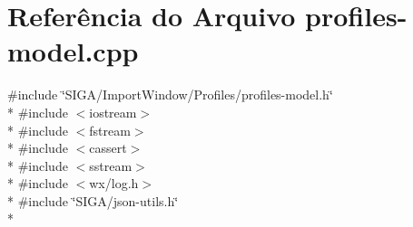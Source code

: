 \section{Referência do Arquivo profiles-\/model.cpp}
\label{profiles-model_8cpp}
{\ttfamily \#include \char`\"{}S\+I\+G\+A/\+Import\+Window/\+Profiles/profiles-\/model.\+h\char`\"{}}\\*
{\ttfamily \#include $<$iostream$>$}\\*
{\ttfamily \#include $<$fstream$>$}\\*
{\ttfamily \#include $<$cassert$>$}\\*
{\ttfamily \#include $<$sstream$>$}\\*
{\ttfamily \#include $<$wx/log.\+h$>$}\\*
{\ttfamily \#include \char`\"{}S\+I\+G\+A/json-\/utils.\+h\char`\"{}}\\*

